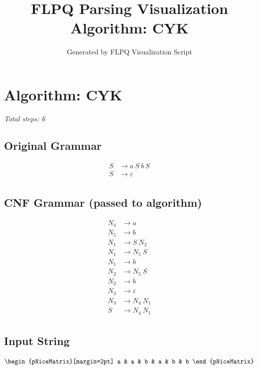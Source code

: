 \documentclass[12pt]{article}
\title{FLPQ Parsing Visualization\\Algorithm: CYK}
\author{Generated by FLPQ Visualization Script}
\date{}
\begin{document}
\maketitle
\tableofcontents

\section*{Algorithm: CYK}
\textit{Total steps: 6}\\
\subsection*{Original Grammar}
\begin{center}
\begin{align*}S &\rightarrow a\ S\ b\ S \\
S &\rightarrow \varepsilon \\
\end{align*}
\end{center}

\subsection*{CNF Grammar (passed to algorithm)}
\begin{center}
\begin{align*}N_{4} &\rightarrow a \\
N_{5} &\rightarrow b \\
N_{1} &\rightarrow S\ N_{2} \\
N_{1} &\rightarrow N_{5}\ S \\
N_{1} &\rightarrow b \\
N_{2} &\rightarrow N_{5}\ S \\
N_{2} &\rightarrow b \\
N_{3} &\rightarrow \varepsilon \\
N_{3} &\rightarrow N_{4}\ N_{1} \\
S &\rightarrow N_{4}\ N_{1} \\
\end{align*}
\end{center}

\subsection*{Input String}
\begin{center}
\[
\begin{pNiceMatrix}[margin=2pt] a & a & b & a & b & b \end{pNiceMatrix}
\]
\end{center}
\end{document}
